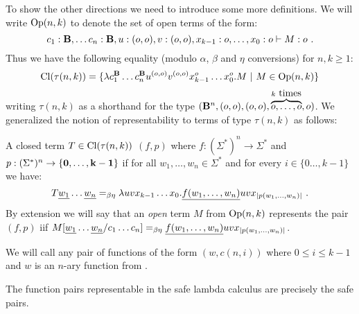To show the other directions we need to introduce some more definitions.
We will write ${\rm Op}(n,k)$ to denote the set of open terms
of the form:
$$c_1:\mathbf{B}, \ldots c_n :\mathbf{B}, u:(o,o), v:(o,o), x_{k-1}:o, \ldots, x_0 :o \vdash M : o \ .$$
Thus we have the following equality (modulo $\alpha$, $\beta$ and
$\eta$ conversions) for $n,k\geq1$:
$${\rm Cl}(\tau(n,k)) = \{ \lambda c_1^{\mathbf{B}} \ldots c_n^{\mathbf{B}} u^{(o,o)} v^{(o,o)} x_{k-1}^o \ldots x_0^o . M \ | \ M \in {\rm Op}(n,k)  \} $$
writing $\tau(n,k)$ as a shorthand for the type
$(\mathbf{B}^n,(o,o),(o,o),\overbrace{o,\ldots,o}^{k\hbox{
times}},o)$. We generalized the notion of representability to terms
of type $\tau(n,k)$ as follows:
\begin{definition}
A closed term $T\in{\rm Cl}(\tau(n,k))$ 
$(f,p)$ where $f:(\Sigma^*)^n \rightarrow \Sigma^*$ and $p:(\Sigma^*)^n \rightarrow \{\mathbf{0}, \ldots, \mathbf{k-1}\}$ if for all $w_1,\ldots,w_n\in\Sigma^*$
and for every $i\in \{0\ldots,k-1\}$ we have:
$$
T \zaioncencode{w_1} \ldots \zaioncencode{w_n} =_{\beta\eta} \lambda u v x_{k-1}\ldots x_0 . \zaioncencode{f(w_1,\ldots,w_n)} u v x_{|p(w_1,\ldots,w_n)|} \ .
$$
By extension we will say that an \emph{open} term $M$ from ${\rm Op}(n,k)$
represents the pair $(f,p)$
iif $M[\underline{w_1}\ldots \underline{w_n}/c_1\ldots c_n] =_{\beta\eta} \underline{f(w_1,\ldots,w_n)} u v x_{|p(w_1,\ldots,w_n)|}$.
\end{definition}

We will call  any pair of functions of the form
$(w,c(n,i))$ where $0\leq i\leq k-1$ and $w$ is an $n$-ary function
from \safedefset.

\begin{theorem}
\label{thm:zaionc_pair_characterization_safe} The function pairs
representable in the safe lambda calculus are precisely the safe
pairs.
\end{theorem}

